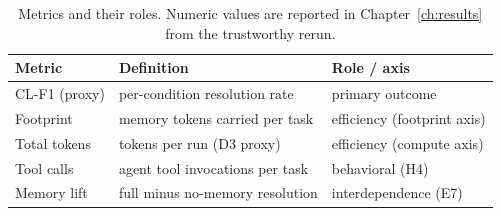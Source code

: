 \begin{table}[htbp]
  \centering
  \caption{Metrics and their roles. Numeric values are reported in
  Chapter~\ref{ch:results} from the trustworthy rerun.}
  \label{tab:metrics}
  \begin{tabular}{lll}
    \toprule
    Metric & Definition & Role / axis \\
    \midrule
    CL-F1 (proxy)   & per-condition resolution rate         & primary outcome \\
    Footprint       & memory tokens carried per task         & efficiency (footprint axis) \\
    Total tokens    & tokens per run (D3 proxy)              & efficiency (compute axis) \\
    Tool calls      & agent tool invocations per task        & behavioral (H4) \\
    Memory lift     & full minus no-memory resolution        & interdependence (E7) \\
    \bottomrule
  \end{tabular}
\end{table}
